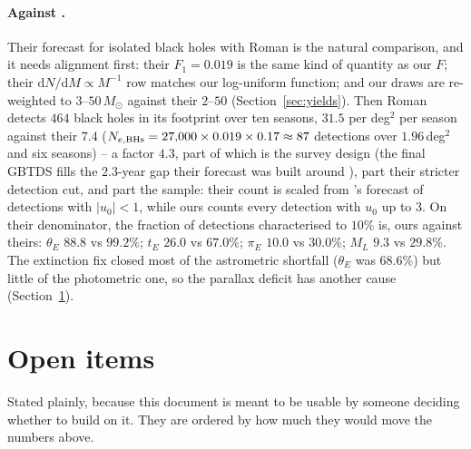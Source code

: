 \documentclass[english,10pt,a4paper]{article}
\begin{document}
	\paragraph{Against \cite{SajadianSahu2023}.} Their forecast for isolated black holes with Roman is the natural comparison, and it needs alignment first: their $F_1 = 0.019$ is the same kind of quantity as our $F$; their $\mathrm{d}N/\mathrm{d}M\propto M^{-1}$ row matches our log-uniform function; and our draws are re-weighted to $3$--$50\,M_\odot$ against their $2$--$50$ (Section~\ref{sec:yields}). Then Roman detects $464$ black holes in its footprint over ten seasons, $31.5$ per deg$^2$ per season against their $7.4$ ($N_{e,\rm BHs}=27{,}000\times0.019\times0.17\approx87$ detections over $1.96$\,deg$^2$ and six seasons) -- a factor $4.3$, part of which is the survey design (the final GBTDS fills the $2.3$-year gap their forecast was built around \cite{ROTAC2025}), part their stricter detection cut, and part the sample: their count is scaled from \cite{penny2019predictions}'s forecast of detections with $|u_0|<1$, while ours counts every detection with $u_0$ up to $3$. On their denominator, the fraction of detections characterised to $10\%$ is, ours against theirs: $\theta_E$ $88.8$ vs $99.2\%$; $t_E$ $26.0$ vs $67.0\%$; $\pi_E$ $10.0$ vs $30.0\%$; $M_L$ $9.3$ vs $29.8\%$. The extinction fix closed most of the astrometric shortfall ($\theta_E$ was $68.6\%$) but little of the photometric one, so the parallax deficit has another cause (Section~\ref{sec:openitems}).


	\section{Open items}
	\label{sec:openitems}

	Stated plainly, because this document is meant to be usable by someone deciding whether to build on it. They are ordered by how much they would move the numbers above.
\end{document}
